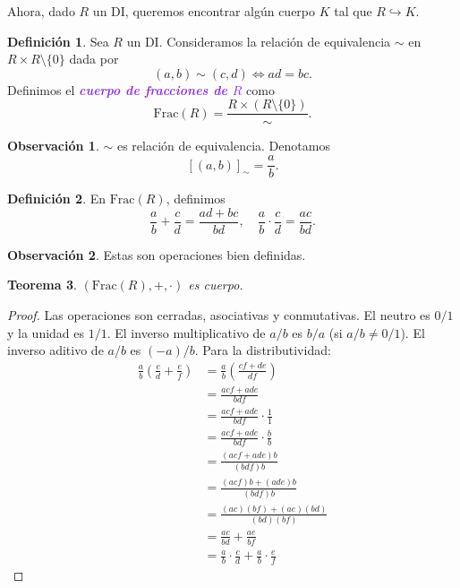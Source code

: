\documentclass{article}
\newtheorem{theorem}{Teorema}[subsection]
\theoremstyle{definition}
\newtheorem{definition}[theorem]{Definición}
\newtheorem*{obs}{Observación}
\theoremstyle{remark}
\numberwithin{equation}{section}
\newcommand{\embed}{\hookrightarrow}
\renewcommand{\c}{\cdot}
\newcommand{\Frac}{\mathrm{Frac}}
\newcommand{\br}[1]{\left( #1 \right)}
\newcommand{\wea}[1]{\textcolor{BlueViolet}{\textbf{\emph{#1}}}}
\begin{document}
Ahora, dado $R$ un DI, queremos encontrar algún cuerpo $K$ tal que $R \embed K$.

\begin{definition}
  Sea $R$ un DI. Consideramos la relación de equivalencia $\sim$ en $R \times R \setminus \{0\}$ dada por 
  \[ (a,b) \sim (c,d) \iff ad = bc. \]
  Definimos el \wea{cuerpo de fracciones de $R$} como 
  \[ \Frac(R) = \frac{R \times (R \setminus \{0\})}{\sim}. \]
\end{definition}

\begin{obs}
  $\sim$ es relación de equivalencia. Denotamos 
  \[ [(a,b)]_\sim = \frac{a}{b}. \]
\end{obs}

\begin{definition}
  En $\Frac(R)$, definimos 
  \[ \frac{a}{b} + \frac{c}{d} = \frac{ad+bc}{bd}, \quad \frac{a}{b} \c \frac{c}{d} = \frac{ac}{bd}. \]
\end{definition}

\begin{obs}
  Estas son operaciones bien definidas.
\end{obs}

\begin{theorem}
  $(\Frac(R),+,\c)$ es cuerpo.
\end{theorem}
\begin{proof}
  Las operaciones son cerradas, asociativas y conmutativas. El neutro es $0/1$ y la unidad es $1/1$.
  El inverso multiplicativo de $a/b$ es $b/a$ (si $a/b \neq 0/1$). El inverso aditivo de $a/b$ es $(-a)/b$. Para la distributividad: 
  \begin{align*}
      \frac{a}{b} \br{\frac{c}{d} + \frac{e}{f}}
      &= \frac{a}{b} \br{\frac{cf+de}{df}} \\
      &= \frac{acf + ade}{bdf} \\
      &= \frac{acf + ade}{bdf} \c \frac{1}{1} \\
      &= \frac{acf + ade}{bdf} \c \frac{b}{b} \\
      &= \frac{(acf + ade)b}{(bdf)b} \\
      &= \frac{(acf)b + (ade)b}{(bdf)b} \\
      &= \frac{(ac)(bf) + (ae)(bd)}{(bd)(bf)} \\
      &= \frac{ac}{bd} + \frac{ae}{bf} \\
      &= \frac{a}{b} \c \frac{c}{d} + \frac{a}{b} \c \frac{e}{f}
  \end{align*}
\end{proof}
\end{document}
